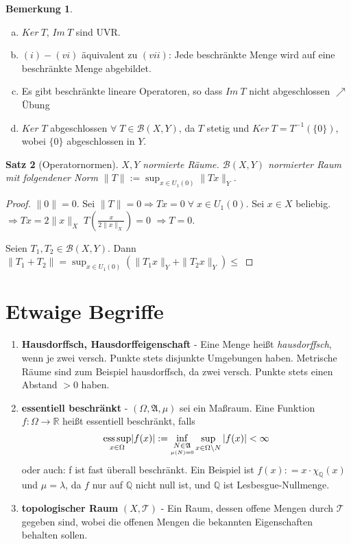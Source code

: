 \documentclass[ngerman]{report}
\theoremstyle{plain}%
\newtheorem{thm}{Satz}[chapter]
\theoremstyle{definition}%
\theoremstyle{myStyle}
\newtheorem{bem}[thm]{Bemerkung}
\newcommand{\R}{\mathbb{R}}
\newcommand{\Q}{\mathbb{Q}}
\newcommand{\hA}{\mathfrak{A}}%
\newcommand{\tT}{\mathcal{T}} %
\newcommand{\B}{\mathcal{B}} %
\newcommand{\BS}[1][X,Y]{\mathcal{B}(#1)} %
\newcommand{\ess}{\textnormal{ess}}
\newcommand{\norm}[1]{\|#1\|}
\newcommand{\df}{\Rightarrow} %
\newcommand{\U}[2][1]{U_{#1}(#2)} %
\newcommand{\EK}{\U{0}} %
\newcommand{\inv}[1]{#1^{-1}}
\begin{document}
	\begin{bem}
		\begin{enumerate}[a)] \addtocounter{enumi}{2}
			\item $Ker\:T$, $Im\:T$ sind UVR. 
			\item $(i) - (vi)$ äquivalent zu $(vii)$:
				Jede beschränkte Menge wird auf eine beschränkte Menge abgebildet.
			\item Es gibt beschränkte lineare Operatoren, so dass $Im\: T$ nicht abgeschlossen $\nearrow$ Übung
			\item $Ker\; T$ abgeschlossen $\forall \; T\in \B(X,Y)$, da $T$ stetig und $Ker\:T = \inv{T}(\{0\})$, wobei $\{0\}$ abgeschlossen in $Y$.
		\end{enumerate}
	\end{bem}					
	
	\begin{thm}[Operatornormen]
		$X,Y$ normierte Räume. $\BS$ normierter Raum mit folgendener Norm
		 $\norm{T} := \displaystyle \sup_{x \in \EK}\norm{Tx}_Y$.
	\end{thm}
	\begin{proof}
		$\norm{0} = 0$. Sei $\norm{T} = 0 \df Tx = 0 \; \forall \; x\in\EK$.
		Sei $x\in X$ beliebig. $\df Tx = 2\norm{x}_X \; T \left(\frac{x}{2\norm{x}_X}\right) = 0$
		$\df T = 0$. \par
		Seien $T_1, T_2 \in\BS$. Dann $\norm{T_1 + T_2} = \sup_{x \in \EK}(\norm{T_1x}_Y + \norm{T_2x}_Y)
		\leq$

	\end{proof}
		

\section*{Etwaige Begriffe}
	\begin{enumerate}
		\item \textbf{Hausdorffsch, Hausdorffeigenschaft} - Eine Menge heißt \textit{hausdorffsch}, wenn je zwei versch. Punkte stets disjunkte Umgebungen haben. Metrische Räume sind zum Beispiel hausdorffsch, da zwei versch. Punkte stets einen Abstand $> 0$ haben.

		\item \textbf{essentiell beschränkt} - 
					$(\Omega, \hA,\mu)$ sei ein Maßraum. Eine Funktion $f: \Omega \rightarrow \R$ heißt essentiell beschränkt, falls 
					$$\underset{x\in\Omega}{\ess \sup} |f(x)| := {\inf_{\underset{\mu(N)=0}{N \in \hA}} }  
					\sup_{x\in \Omega\backslash N} |f(x)| < \infty$$
					oder auch: f ist fast überall beschränkt. 
					Ein Beispiel ist $f(x) : = x\cdot \chi_\Q(x)$ und $\mu = \lambda$, da $f$ nur auf $\Q$ nicht null ist, und $\Q$ ist Lesbesgue-Nullmenge. 

		\item \textbf{topologischer Raum} $(X,\tT)$ - Ein Raum, dessen offene Mengen durch $\tT$ gegeben sind, wobei die offenen Mengen die bekannten Eigenschaften behalten sollen.
	\end{enumerate} 
 
\end{document}
